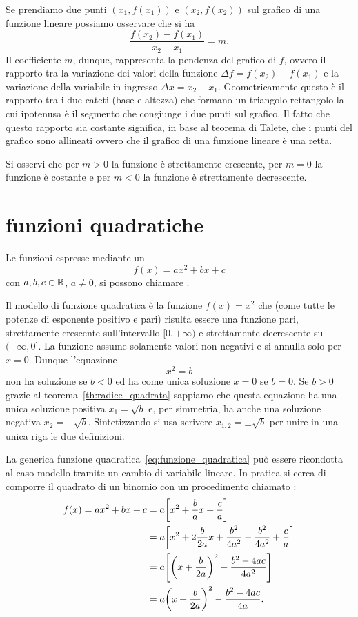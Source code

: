 Se prendiamo due punti $(x_1,f(x_1))$
e $(x_2,f(x_2))$ sul grafico di una funzione lineare
possiamo osservare che si ha
\[
  \frac{f(x_2) - f(x_1)}{x_2 - x_1} = m.
\]
Il coefficiente $m$, dunque, rappresenta la pendenza del
grafico di $f$, ovvero il rapporto tra la variazione
dei valori della funzione $\Delta f = f(x_2) - f(x_1)$
e la variazione della variabile in ingresso
$\Delta x = x_2 - x_1$.
Geometricamente questo è il rapporto tra i due cateti
(base e altezza) che formano un triangolo rettangolo la
cui ipotenusa è il segmento che congiunge i due punti sul grafico.
Il fatto che questo rapporto sia costante significa,
in base al teorema di Talete, che i punti del grafico sono
allineati ovvero che il grafico di una funzione lineare è una retta.

Si osservi che per $m>0$ la funzione è strettamente crescente,
per $m=0$ la funzione è costante e per $m<0$ la funzione è
strettamente decrescente.

\section{funzioni quadratiche}

Le funzioni espresse mediante un 
\begin{equation}\label{eq:funzione_quadratica}
  f(x) = ax^2 + bx +c
\end{equation}
con $a,b,c\in \mathbb R$, $a\neq 0$, si possono chiamare
.

Il modello di funzione quadratica è la funzione
$f(x) = x^2$ che (come tutte le potenze di esponente positivo e pari)
risulta essere una funzione pari, strettamente crescente
sull'intervallo $[0,+\infty)$ e strettamente decrescente
su $(-\infty,0]$. La funzione assume solamente valori non negativi
e si annulla solo per $x=0$.
Dunque l'equazione
\[
  x^2 = b
\]
non ha soluzione se $b<0$ ed ha come unica soluzione $x=0$ se $b=0$.
Se $b>0$ grazie al teorema~\ref{th:radice_quadrata} sappiamo che
questa equazione ha una unica soluzione positiva $x_1 = \sqrt{b}$
e, per simmetria, ha anche una soluzione negativa $x_2 = -\sqrt{b}$.
Sintetizzando si usa scrivere $x_{1,2} = \pm \sqrt{b}$
per unire in una unica riga le due definizioni.

La generica funzione quadratica~\eqref{eq:funzione_quadratica}
può essere ricondotta al caso modello tramite un cambio
di variabile lineare. In pratica si cerca di comporre il quadrato
di un binomio con un procedimento chiamato
:
\begin{equation}\label{eq:24589}
\begin{aligned}
f(x) = ax^2+bx+c
  &= a {\left[ x^2+\frac b a x + \frac c a \right]}\\
  &= a {\left[ x^2+2 \frac{b}{2a} x + \frac{b^2}{4a^2} - \frac{b^2}{4a^2} + \frac c a \right]}\\
  &= a {\left[ {\left( x+\frac{b}{2a} \right)}^2 - \frac{b^2-4ac}{4a^2} \right]} \\
  &= a{\left( x+\frac b{2a} \right)}^2  - \frac{b^2-4ac}{4a}.
\end{aligned}
\end{equation}

